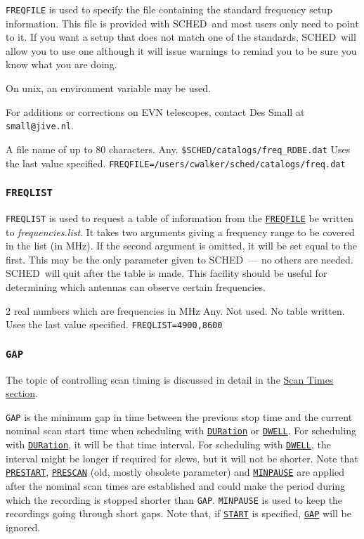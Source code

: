 \documentclass{report}
\newcommand{\schedb}{{\sc SCHED~}}
\begin{document}
{\tt FREQFILE} is used to specify the file containing the standard
frequency setup information.  This file is provided with \schedb and
most users only need to point to it.  If you want a setup that does
not match one of the standards, \schedb will allow you to use one
although it will issue warnings to remind you to be sure you know what
you are doing.

On unix, an environment variable may be used.

For additions or corrections on EVN telescopes, contact
Des Small at {\tt small@jive.nl}.


{A file name of up to 80 characters.}
{Any.}
{{\tt \$SCHED/catalogs/freq\_RDBE.dat}}
{Uses the last value specified.}
{{\tt FREQFILE=/users/cwalker/sched/catalogs/freq.dat}}


\subsubsection{\label{MP:FREQLIST}{\tt FREQLIST}}

{\tt FREQLIST} is used to request a table of information from the
{\hyperref[MP:FREQFILE]{{\tt FREQFILE}}} be written to {\sl
frequencies.list}.  It takes two arguments giving a frequency range to
be covered in the list (in MHz).  If the second argument is omitted,
it will be set equal to the first.  This may be the only parameter
given to \schedb --- no others are needed.  \schedb will quit after
the table is made.  This facility should be useful for determining
which antennas can observe certain frequencies.

{2 real numbers which are frequencies in MHz}
{Any.}
{Not used.  No table written.}
{Uses the last value specified.}
{{\tt FREQLIST=4900,8600}}


\subsubsection{\label{MP:GAP}{\tt GAP}}

The topic of controlling scan timing is discussed in detail in
the 
{\hyperref[SSEC:SCANTIMES]{Scan Times section}}.

{\tt GAP} is the minimum gap in time between the previous stop time
and the current nominal scan start time when scheduling with
{\hyperref[MP:DUR]{{\tt DURation}}} or 
{\hyperref[MP:DWELL]{{\tt DWELL}}}.
For scheduling with 
{\hyperref[MP:DUR]{{\tt DURation}}}, it will be that
time interval.  For scheduling with 
{\hyperref[MP:DWELL]{{\tt DWELL}}},
the interval might be longer if required for slews, but it will not be
shorter.  Note that 
{\hyperref[MP:PRESTART]{{\tt PRESTART}}},
{\hyperref[MP:PRESCAN]{{\tt PRESCAN}}} (old, mostly obsolete parameter) and
{\hyperref[MP:MINPAUSE]{{\tt MINPAUSE}}} are applied after the nominal
scan times are established and could make the period during which the
recording is stopped shorter than {\tt GAP}.  {\tt MINPAUSE} is used
to keep the recordings going through short gaps.  Note that, if
{\hyperref[MP:START]{{\tt START}}} is specified, 
{\hyperref[MP:GAP]{{\tt GAP}}} will be ignored.
\end{document}
